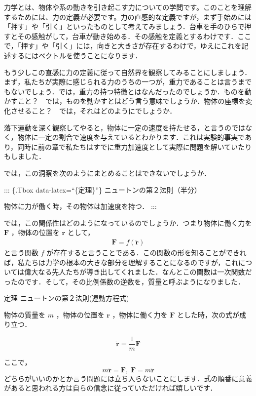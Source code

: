 \documentclass[
  b4paperpaper,
  xelatex,ja=standard]{bxjsbook}
\begin{document}
力学とは、物体や系の動きを引き起こす力についての学問です。このことを理解するためには、力の定義が必要です。力の直感的な定義ですが，まず手始めには「押す」や「引く」といったものとして考えてみましょう．台車を手のひらで押すとその感触がして，台車が動き始める．その感触を定義とするわけです．ここで，「押す」や「引く」には，向きと大きさが存在するわけで，ゆえにこれを記述するにはベクトルを使うことになります．

もう少しこの直感に力の定義に従って自然界を観察してみることにしましょう．まず，私たちが実際に感じられる力のうちの一つが，重力であることは言うまでもないでしょう．では，重力の持つ特徴とはなんだったのでしょうか．ものを動かすこと？　では，ものを動かすとはどう言う意味でしょうか．物体の座標を変化させること？　では，それはどのようにでしょうか．

落下運動を深く観察してやると，物体に一定の速度を持たせる，と言うのではなく，物体に一定の割合で速度を与えているとわかります．これは実験的事実であり，同時に前の章で私たちはすでに重力加速度として実際に問題を解いていたりもしました．

では，この洞察を次のようにまとめることはできないでしょうか．

::: \{.Tbox data-latex=``\{定理\}''\} ニュートンの第２法則（半分）

物体に力が働く時，その物体は加速度を持つ． :::

では，この関係性はどのようになっているのでしょうか．つまり物体に働く力を
\(\boldsymbol{F}\) ，物体の位置を \(\boldsymbol{r}\) として，
\begin{align*}
    \boldsymbol{F} = f(\ddot{\boldsymbol{r}})
\end{align*} と言う関数 \(f\)
が存在すると言うことである．この関数の形を知ることができれば，私たちは力学の根本の大きな部分を理解することになるのですが，これについては偉大なる先人たちが導き出してくれました．なんとこの関数は一次関数だったのです．そして，その比例係数の逆数を，質量と呼ぶようになりました．

\begin{Tbox}{定理}
ニュートンの第２法則(運動方程式)

物体の質量を \(m\) ，物体の位置を \(\boldsymbol{r}\) ，物体に働く力を
\(\boldsymbol{F}\) とした時，次の式が成り立つ．

\[\ddot{\boldsymbol{r}}=\frac{1}{m}\boldsymbol{F}\]

\end{Tbox}

ここで，\[m\ddot{\boldsymbol{r}}=\boldsymbol{F},\;\boldsymbol{F}=m\ddot{\boldsymbol{r}}\]
どちらがいいのかとか言う問題には立ち入らないことにします．式の順番に意義があると思われる方は自らの信念に従っていただければ嬉しいです．
\end{document}

